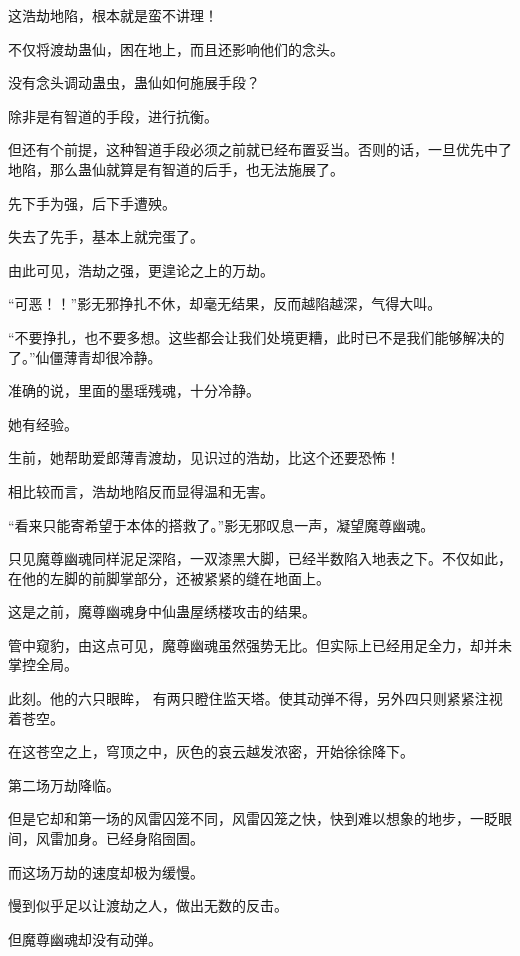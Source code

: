
\begin{this_body}



这浩劫地陷，根本就是蛮不讲理！

不仅将渡劫蛊仙，困在地上，而且还影响他们的念头。

没有念头调动蛊虫，蛊仙如何施展手段？

除非是有智道的手段，进行抗衡。

但还有个前提，这种智道手段必须之前就已经布置妥当。否则的话，一旦优先中了地陷，那么蛊仙就算是有智道的后手，也无法施展了。

先下手为强，后下手遭殃。

失去了先手，基本上就完蛋了。

由此可见，浩劫之强，更遑论之上的万劫。

“可恶！！”影无邪挣扎不休，却毫无结果，反而越陷越深，气得大叫。

“不要挣扎，也不要多想。这些都会让我们处境更糟，此时已不是我们能够解决的了。”仙僵薄青却很冷静。

准确的说，里面的墨瑶残魂，十分冷静。

她有经验。

生前，她帮助爱郎薄青渡劫，见识过的浩劫，比这个还要恐怖！

相比较而言，浩劫地陷反而显得温和无害。

“看来只能寄希望于本体的搭救了。”影无邪叹息一声，凝望魔尊幽魂。

只见魔尊幽魂同样泥足深陷，一双漆黑大脚，已经半数陷入地表之下。不仅如此，在他的左脚的前脚掌部分，还被紧紧的缝在地面上。

这是之前，魔尊幽魂身中仙蛊屋绣楼攻击的结果。

管中窥豹，由这点可见，魔尊幽魂虽然强势无比。但实际上已经用足全力，却并未掌控全局。

此刻。他的六只眼眸， 有两只瞪住监天塔。使其动弹不得，另外四只则紧紧注视着苍空。

在这苍空之上，穹顶之中，灰色的哀云越发浓密，开始徐徐降下。

第二场万劫降临。

但是它却和第一场的风雷囚笼不同，风雷囚笼之快，快到难以想象的地步，一眨眼间，风雷加身。已经身陷囹圄。

而这场万劫的速度却极为缓慢。

慢到似乎足以让渡劫之人，做出无数的反击。

但魔尊幽魂却没有动弹。


\end{this_body}
